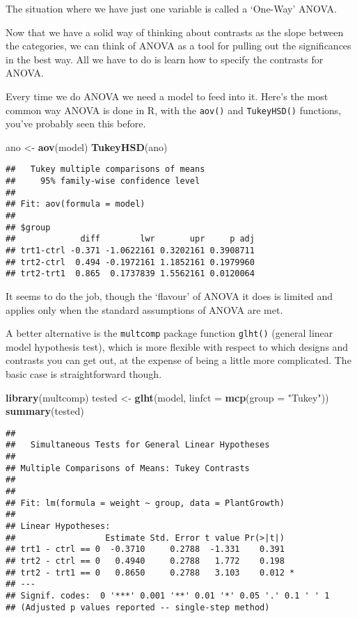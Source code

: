 \documentclass[]{book}
\newenvironment{Shaded}{\begin{snugshade}}{\end{snugshade}}
\newcommand{\DataTypeTok}[1]{\textcolor[rgb]{0.13,0.29,0.53}{#1}}
\newcommand{\KeywordTok}[1]{\textcolor[rgb]{0.13,0.29,0.53}{\textbf{#1}}}
\newcommand{\NormalTok}[1]{#1}
\newcommand{\StringTok}[1]{\textcolor[rgb]{0.31,0.60,0.02}{#1}}
\begin{document}
The situation where we have just one variable is called a `One-Way' ANOVA.

Now that we have a solid way of thinking about contrasts as the slope between the categories, we can think of ANOVA as a tool for pulling out the significances in the best way. All we have to do is learn how to specify the contrasts for ANOVA.

Every time we do ANOVA we need a model to feed into it. Here's the most common way ANOVA is done in R, with the \texttt{aov()} and \texttt{TukeyHSD()} functions, you've probably seen this before.

\begin{Shaded}
\begin{Highlighting}[]
\NormalTok{ano <-}\StringTok{ }\KeywordTok{aov}\NormalTok{(model)}
\KeywordTok{TukeyHSD}\NormalTok{(ano)}
\end{Highlighting}
\end{Shaded}

\begin{verbatim}
##   Tukey multiple comparisons of means
##     95% family-wise confidence level
## 
## Fit: aov(formula = model)
## 
## $group
##             diff        lwr       upr     p adj
## trt1-ctrl -0.371 -1.0622161 0.3202161 0.3908711
## trt2-ctrl  0.494 -0.1972161 1.1852161 0.1979960
## trt2-trt1  0.865  0.1737839 1.5562161 0.0120064
\end{verbatim}

It seems to do the job, though the `flavour' of ANOVA it does is limited and applies only when the standard assumptions of ANOVA are met.

A better alternative is the \texttt{multcomp} package function \texttt{glht()} (general linear model hypothesis test), which is more flexible with respect to which designs and contrasts you can get out, at the expense of being a little more complicated. The basic case is straightforward though.

\begin{Shaded}
\begin{Highlighting}[]
\KeywordTok{library}\NormalTok{(multcomp)}
\NormalTok{tested <-}\StringTok{ }\KeywordTok{glht}\NormalTok{(model, }\DataTypeTok{linfct =} \KeywordTok{mcp}\NormalTok{(}\DataTypeTok{group =} \StringTok{"Tukey"}\NormalTok{))}
\KeywordTok{summary}\NormalTok{(tested)}
\end{Highlighting}
\end{Shaded}

\begin{verbatim}
## 
##   Simultaneous Tests for General Linear Hypotheses
## 
## Multiple Comparisons of Means: Tukey Contrasts
## 
## 
## Fit: lm(formula = weight ~ group, data = PlantGrowth)
## 
## Linear Hypotheses:
##                  Estimate Std. Error t value Pr(>|t|)  
## trt1 - ctrl == 0  -0.3710     0.2788  -1.331    0.391  
## trt2 - ctrl == 0   0.4940     0.2788   1.772    0.198  
## trt2 - trt1 == 0   0.8650     0.2788   3.103    0.012 *
## ---
## Signif. codes:  0 '***' 0.001 '**' 0.01 '*' 0.05 '.' 0.1 ' ' 1
## (Adjusted p values reported -- single-step method)
\end{verbatim}
\end{document}
